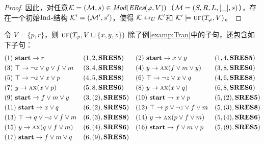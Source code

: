 \begin{proof}
	因此，对任意${\cal K}=({\cal M}, s)\in \textit{Mod}(\emph{ERes}(\varphi,V))$（${\cal M}=(S, R, L, [\_], s)$），存在一个初始$\textrm{Ind}$-结构 ${\cal K}'=({\cal M}', s')$，使得 ${\cal K} \leftrightarrow_{U} {\cal K}'$和 ${\cal K}' \models \textsc{uf}(T_\varphi,V)$。
\end{proof}


\begin{example}\label{examp:Res}
	令 $V=\{p,r\}$，则  $\textsc{uf}(T_\varphi, V\cup \{x,y,z\})$ 除了例\ref{examp:Tran}中的子句，还包含如下子句：
	\begin{align*}
		&(1)\ \textbf{start} \rightarrow r && (1,2,\textbf{SRES5})
		&&(2)\ \textbf{start} \rightarrow x \vee y && (1,4,\textbf{SRES5})\\
		&(3)\ \top \rightarrow \neg z \vee y \vee f \vee m && (3, 4, \textbf{SRES8})
		&&(4)\ y \rightarrow \textsc{a}\textsc{x}(f\vee m\vee y) && (3,8, \textbf{SRES6})\\
		&(5)\ \top \rightarrow \neg z \vee x \vee p && (4,5, \textbf{SRES8})
		&&(6)\ \top \rightarrow \neg z \vee x \vee q && (4,6, \textbf{SRES8})\\
		&(7)\ y \rightarrow \textsc{a}\textsc{x}(x\vee p) && (5, 8, \textbf{SRES6})
		&&(8)\ y \rightarrow \textsc{a}\textsc{x}(x\vee q) && (6, 8, \textbf{SRES6})\\
		&(9)\ \textbf{start} \rightarrow f\vee m \vee y && (3,(2), \textbf{SRES5})
		&&(10)\ \textbf{start} \rightarrow x \vee p && (5,(2),\textbf{SRES5}) \\
		&(11)\ \textbf{start} \rightarrow x \vee q && (6,(2), \textbf{SRES5})
		&& (12)\ \top \rightarrow p \vee \neg z \vee f \vee m && (5,(3), \textbf{SRES8})\\
		& (13)\ \top \rightarrow q \vee \neg z \vee f \vee m && (6,(3), \textbf{SRES8})
		&&(14)\ y \rightarrow \textsc{a}\textsc{x}(p \vee f\vee m) && (5, (4), \textbf{SRES6})\\
		&(15)\ y \rightarrow \textsc{a}\textsc{x}(q \vee f\vee m) && (6, (4), \textbf{SRES6})
		&&(16)\ \textbf{start} \rightarrow f\vee m \vee p && (5, (9), \textbf{SRES5}) \\
		&(17)\ \textbf{start} \rightarrow f\vee m \vee q && (6, (9), \textbf{SRES5})
	\end{align*}
	

\end{example}
